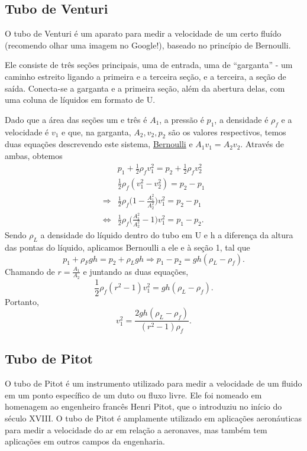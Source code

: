 \documentclass{article}
\begin{document}
\subsection{Tubo de Venturi}
  O tubo de Venturi é um aparato para medir a velocidade de um certo fluído (recomendo olhar uma imagem no Google!), baseado no princípio de Bernoulli.

Ele consiste de três seções principais, uma de entrada, uma de ``garganta'' - um caminho estreito ligando a primeira e a terceira seção, e a terceira, a seção de saída.
Conecta-se a garganta e a primeira seção, além da abertura delas, com uma coluna de líquidos em formato de U.

Dado que a área das seções um e três é \(A_{1}\), a pressão é \(p_{1}\), a densidade é \(\rho_{f}\)
e a velocidade é \(v_{1}\) e que, na garganta, \(A_{2}, v_{2}, p_{2}\) são os valores respectivos, 
temos duas equações descrevendo este sistema, \hyperlink{bernoulli}{Bernoulli}
e \(A_{1}v_{1} = A_{2}v_{2}.\) Através de ambas, obtemos 
\begin{align*}
  &p_{1}+\frac{1}{2}\rho_{f}v_{1}^{2} = p_{2} + \frac{1}{2}\rho_{f}v_{2}^{2}\\
  &\frac{1}{2}\rho_{f}(v_{1}^{2}-v_{2}^{2}) = p_{2}-p_{1}\\
  \Longrightarrow &\frac{1}{2}\rho_{f}\biggl(1-\frac{A_{1}^{2}}{A_{2}^{2}}\biggr)v_{1}^{2} = p_{2}-p_{1}\\
  \Longleftrightarrow &\frac{1}{2}\rho_{f} \biggl(\frac{A_{1}^{2}}{A_{2}^{2}}-1\biggr)v_{1}^{2} = p_{1}-p_{2}.
\end{align*}
  Sendo \(\rho_{L}\) a densidade do líquido dentro do tubo em U e h a diferença da altura das pontas do líquido, aplicamos Bernoulli a ele e à seção 1, tal que 
    \[
      p_{1}+\rho_{F}gh = p_{2}+\rho_{L}gh \Rightarrow p_{1}-p_{2} = gh(\rho_{L}-\rho_{f}).
    \]
  Chamando de \(r = \frac{A_{1}}{A_{2}}\) e juntando as duas equações, 
    \[
      \frac{1}{2}\rho_{f}(r^{2}-1)v_{1}^{2} = gh(\rho_{L}-\rho_{f}).
    \]
  Portanto, 
    \[
      v_{1}^{2} = \frac{2gh(\rho_{L}-\rho _{f})}{(r^{2}-1)\rho_{f}}.
    \]
\subsection{Tubo de Pitot}
  O tubo de Pitot é um instrumento utilizado para medir a velocidade de um fluido
em um ponto específico de um duto ou fluxo livre. Ele foi nomeado em homenagem
ao engenheiro francês Henri Pitot, que o introduziu no início do século XVIII. 
O tubo de Pitot é amplamente utilizado em aplicações aeronáuticas para medir a 
velocidade do ar em relação a aeronaves, mas também tem aplicações em outros
campos da engenharia.
\end{document}
